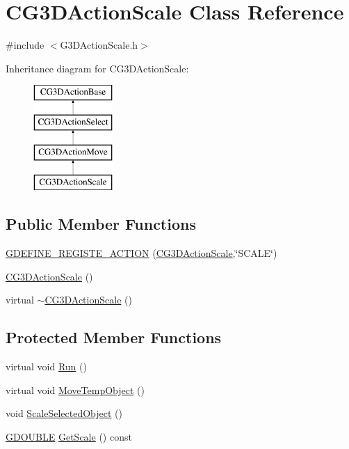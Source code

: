 \hypertarget{class_c_g3_d_action_scale}{}\section{C\+G3\+D\+Action\+Scale Class Reference}
\label{class_c_g3_d_action_scale}


{\ttfamily \#include $<$G3\+D\+Action\+Scale.\+h$>$}

Inheritance diagram for C\+G3\+D\+Action\+Scale\+:\begin{figure}[H]
\begin{center}
\leavevmode
\includegraphics[height=4.000000cm]{class_c_g3_d_action_scale}
\end{center}
\end{figure}
\subsection*{Public Member Functions}
\begin{DoxyCompactItemize}
\item 
\hyperlink{class_c_g3_d_action_scale_ab97296fcb6d78eb2095e89bc00717b7d}{G\+D\+E\+F\+I\+N\+E\+\_\+\+R\+E\+G\+I\+S\+T\+E\+\_\+\+A\+C\+T\+I\+O\+N} (\hyperlink{class_c_g3_d_action_scale}{C\+G3\+D\+Action\+Scale},\char`\"{}S\+C\+A\+L\+E\char`\"{})
\item 
\hyperlink{class_c_g3_d_action_scale_a91dd8a621c240496ce17d6e3d6b56221}{C\+G3\+D\+Action\+Scale} ()
\item 
virtual \hyperlink{class_c_g3_d_action_scale_acd5a7d17f642c730e2cf3c60d4c70b0b}{$\sim$\+C\+G3\+D\+Action\+Scale} ()
\end{DoxyCompactItemize}
\subsection*{Protected Member Functions}
\begin{DoxyCompactItemize}
\item 
virtual void \hyperlink{class_c_g3_d_action_scale_abbdf9f2b0878ded769ee0d19b4778516}{Run} ()
\item 
virtual void \hyperlink{class_c_g3_d_action_scale_ac78e1c95d1074b9b0b0f946bcf923485}{Move\+Temp\+Object} ()
\item 
void \hyperlink{class_c_g3_d_action_scale_a13d738f1a23e56671a8b564bb3dbaf75}{Scale\+Selected\+Object} ()
\item 
\hyperlink{_g_types_8h_afd05ac85f90ee8e2a733928545462cd4}{G\+D\+O\+U\+B\+L\+E} \hyperlink{class_c_g3_d_action_scale_aaf1bcdee140342a29fc5cc72b57e7e39}{Get\+Scale} () const 
\end{DoxyCompactItemize}
